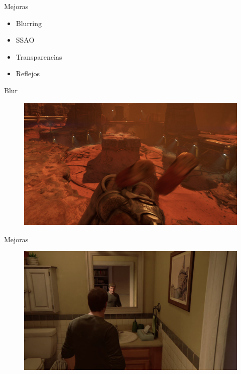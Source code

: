 \documentclass[table]{beamer}
\begin{document}
\begin{frame}[fragile]{Mejoras}
    \begin{itemize}
        \item Blurring
        \item SSAO
        \item Transparencias
        \item Reflejos
    \end{itemize}
\end{frame}

\begin{frame}[fragile]{Blur}
    \begin{figure}
        \includegraphics[width=\linewidth]{./figures/doomblur1.png}
    \end{figure}
\end{frame}


\begin{frame}[fragile]{Mejoras}
    \begin{figure}
        \includegraphics[width=\linewidth]{./figures/reflection.png}
    \end{figure}
\end{frame}

\frame{\titlepage}
\end{document}
